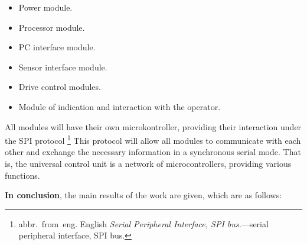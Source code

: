 \begin{itemize}
\item Power module.
\item Processor module.
\item PC interface module.
\item Sensor interface module.
\item Drive control modules.
\item Module of indication and interaction with the operator.
\end{itemize}

All modules will have their own microkontroller, providing their interaction under the SPI protocol \footnote{abbr.~from~eng. English \textit{Serial Peripheral Interface, SPI bus.}---serial peripheral interface, SPI bus.} This protocol will allow all modules to communicate with each other and exchange the necessary information in a synchronous serial mode. That is, the universal control unit is a network of microcontrollers, providing various functions.

\FloatBarrier                      
\textbf{In conclusion}, the main results of the work are given, which are as follows:


